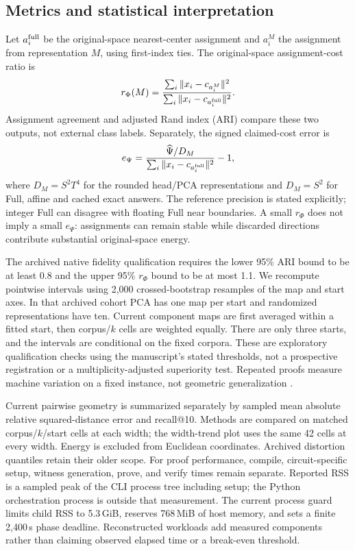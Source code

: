 \subsection{Metrics and statistical interpretation}
Let $a_i^{\rm full}$ be the original-space nearest-center assignment and $a_i^M$ the assignment from representation $M$, using first-index ties. The original-space assignment-cost ratio is
\begin{equation}
r_\Phi(M)=\frac{\sum_i\|x_i-c_{a_i^M}\|^2}{\sum_i\|x_i-c_{a_i^{\rm full}}\|^2}.
\end{equation}
Assignment agreement and adjusted Rand index (ARI) compare these two outputs, not external class labels. Separately, the signed claimed-cost error is
\begin{equation}
e_\Psi=\frac{\widehat\Psi/D_M}{\sum_i\|x_i-c_{a_i^{\rm full}}\|^2}-1,
\end{equation}
where $D_M=S^2T^4$ for the rounded head/PCA representations and $D_M=S^2$ for Full, affine and cached exact answers. The reference precision is stated explicitly; integer Full can disagree with floating Full near boundaries. A small $r_\Phi$ does not imply a small $e_\Psi$: assignments can remain stable while discarded directions contribute substantial original-space energy.

The archived native fidelity qualification requires the lower 95\% ARI bound to be at least 0.8 and the upper 95\% $r_\Phi$ bound to be at most 1.1. We recompute pointwise intervals using 2,000 crossed-bootstrap resamples of the map and start axes. In that archived cohort PCA has one map per start and randomized representations have ten. Current component maps are first averaged within a fitted start, then corpus/$k$ cells are weighted equally. There are only three starts, and the intervals are conditional on the fixed corpora. These are exploratory qualification checks using the manuscript's stated thresholds, not a prospective registration or a multiplicity-adjusted superiority test. Repeated proofs measure machine variation on a fixed instance, not geometric generalization \cite{kalibera2013effect}.

Current pairwise geometry is summarized separately by sampled mean absolute relative squared-distance error and recall@10. Methods are compared on matched corpus/$k$/start cells at each width; the width-trend plot uses the same 42 cells at every width. Energy is excluded from Euclidean coordinates. Archived distortion quantiles retain their older scope. For proof performance, compile, circuit-specific setup, witness generation, prove, and verify times remain separate. Reported RSS is a sampled peak of the CLI process tree including setup; the Python orchestration process is outside that measurement. The current process guard limits child RSS to 5.3\,GiB, reserves 768\,MiB of host memory, and sets a finite 2,400\,s phase deadline. Reconstructed workloads add measured components rather than claiming observed elapsed time or a break-even threshold.

